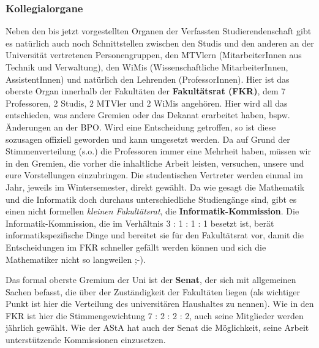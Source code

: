 \begin{multicols}{2}
	\subsubsection*{Kollegialorgane}
		Neben den bis jetzt vorgestellten Organen der Verfassten Studierendenschaft gibt es natürlich auch noch Schnittstellen zwischen den Studis und den anderen an der Universität vertretenen Personengruppen, den MTVlern (MitarbeiterInnen aus Technik und Verwaltung), den WiMis (Wissenschaftliche MitarbeiterInnen, AssistentInnen) und natürlich den Lehrenden (ProfessorInnen). Hier ist das oberste Organ innerhalb der Fakultäten der \textbf{Fakultätsrat (FKR)}, dem 7 Professoren, 2 Studis, 2 MTVler und 2 WiMis angehören. Hier wird all das entschieden, was andere Gremien oder das Dekanat erarbeitet haben, bspw. Änderungen an der BPO. Wird eine Entscheidung getroffen, so ist diese sozusagen offiziell geworden und kann umgesetzt werden. Da auf Grund der Stimmenverteilung (s.o.) die Professoren immer eine Mehrheit haben, müssen wir in den Gremien, die vorher die inhaltliche Arbeit leisten, versuchen, unsere und eure Vorstellungen einzubringen. Die studentischen Vertreter werden einmal im Jahr, jeweils im Wintersemester, direkt gewählt. Da wie gesagt die Mathematik und die Informatik doch durchaus unterschiedliche Studiengänge sind, gibt es einen nicht formellen \emph{kleinen Fakultätsrat}, die \textbf{Informatik-Kommission}. Die Informatik-Kommission, die im Verhältnis 3 : 1 : 1 : 1 besetzt ist, berät informatikspezifische Dinge und bereitet sie für den Fakultätsrat vor, damit die Entscheidungen im FKR schneller gefällt werden können und sich die Mathematiker nicht so langweilen ;-).

		Das formal oberste Gremium der Uni ist der \textbf{Senat}, der sich mit allgemeinen Sachen befasst, die über der Zuständigkeit der Fakultäten liegen (als wichtiger Punkt ist hier die Verteilung des universitären Haushaltes zu nennen). Wie in den FKR ist hier die Stimmengewichtung 7 : 2 : 2 : 2, auch seine Mitglieder werden jährlich gewählt. Wie der AStA hat auch der Senat die Möglichkeit, seine Arbeit unterstützende Kommissionen einzusetzen.


\end{multicols}
